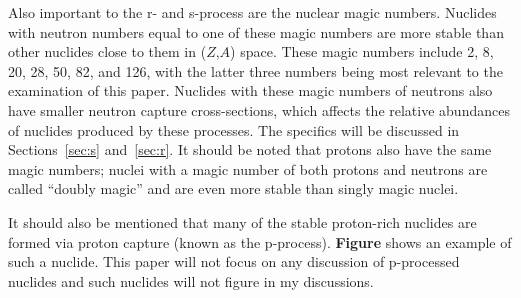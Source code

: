 Also important to the r- and s-process are the nuclear magic numbers.
Nuclides with neutron numbers equal to one of these magic numbers are
more stable than other nuclides close to them in ($Z$,$A$) space.
These magic numbers include 2, 8, 20, 28, 50, 82, and 126, with the
latter three numbers being most relevant to the examination of this
paper.  Nuclides with these magic numbers of neutrons also have 
smaller neutron capture cross-sections, which affects the
relative abundances of nuclides produced by these processes.  The
specifics will be discussed in Sections~\ref{sec:s} and~\ref{sec:r}.
It should be noted that protons also have the same magic numbers;
nuclei with a magic number of both protons and neutrons are called
``doubly magic'' and are even more stable than singly magic nuclei.  

It should also be mentioned that many of the stable proton-rich
nuclides are formed via proton capture (known as the p-process).  {\bf
Figure} shows an example of such a nuclide.  This paper will not focus
on any discussion of p-processed nuclides and such nuclides will not
figure in my discussions.
